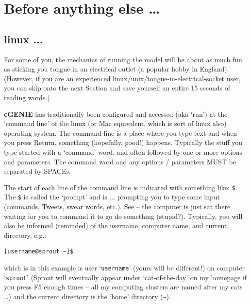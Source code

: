 \documentclass[11pt,fleqn]{book} %
\begin{document}

\newpage


\section{Before anything else …}


\subsection{linux ...}

For some of you, the mechanics of running the model will be about as much fun as sticking you tongue in an electrical outlet (a popular hobby in England). (However, if you are an experienced linux/unix/tongue-in-electrical-socket user, you can skip onto the next Section and save yourself an entire 15 seconds of reading words.)

\textbf{cGENIE} has traditionally been configured and accessed (aka ‘run') at the ‘command line’ of the linux (or Mac equivalent, which is sort of linux also) operating system. The command line is a place where you type text and when you press Return, something (hopefully, good!) happens. Typically the stuff you type started with a ‘command’ word, and often followed by one or more options and parameters. The command word and any options / parameters MUST be separated by SPACEs.

The start of each line of the command line is indicated with something like: \texttt{\$}. The \texttt{\$} is called the ‘prompt’ and is ... prompting you to type some input (commands, Tweets, swear words, etc.). See – the computer is just sat there waiting for you to command it to go do something (stupid?). Typically, you will also be informed (reminded) of the username, computer name, and current directory, e.g.:

\begin{verbatim}
[username@sprout ~]$
\end{verbatim}

\noindent which is in this example is user ‘\texttt{username}’ (yours will be different!) on computer ‘\texttt{sprout}’ (Sprout will eventually appear under ‘cat-of-the-day’ on my homepage if you press \textsf{F5} enough times – all my computing clusters are named after my cats …) and the current directory is the ‘home’ directory (\texttt{\~}).
\end{document}
